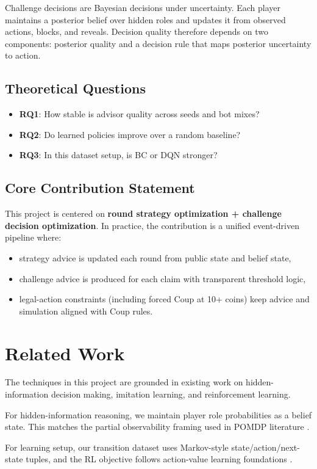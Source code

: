 \documentclass[11pt]{article}
\begin{document}
Challenge decisions are Bayesian decisions under uncertainty. Each player maintains a posterior belief over hidden roles and updates it from observed actions, blocks, and reveals. Decision quality therefore depends on two components: posterior quality and a decision rule that maps posterior uncertainty to action.

\subsection*{Theoretical Questions}
\begin{itemize}
  \item \textbf{RQ1}: How stable is advisor quality across seeds and bot mixes?
  \item \textbf{RQ2}: Do learned policies improve over a random baseline?
  \item \textbf{RQ3}: In this dataset setup, is BC or DQN stronger?
\end{itemize}

\subsection*{Core Contribution Statement}
This project is centered on \textbf{round strategy optimization + challenge decision optimization}. In practice, the contribution is a unified event-driven pipeline where:
\begin{itemize}
  \item strategy advice is updated each round from public state and belief state,
  \item challenge advice is produced for each claim with transparent threshold logic,
  \item legal-action constraints (including forced Coup at 10+ coins) keep advice and simulation aligned with Coup rules.
\end{itemize}

\section{Related Work}
The techniques in this project are grounded in existing work on hidden-information decision making, imitation learning, and reinforcement learning.

For hidden-information reasoning, we maintain player role probabilities as a belief state. This matches the partial observability framing used in POMDP literature \cite{kaelbling1998pomdp}.

For learning setup, our transition dataset uses Markov-style state/action/next-state tuples, and the RL objective follows action-value learning foundations \cite{watkins1992qlearning}.
\end{document}
